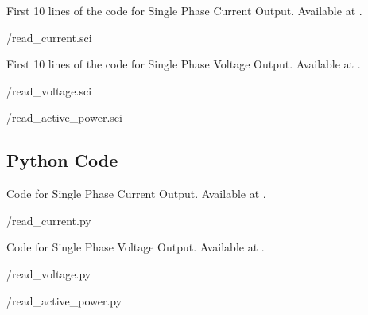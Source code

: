 \begin{scicode}
{First 10 lines of the code for Single Phase Current Output.
  Available at .}
\label{sci:current-modbus}

{\LocMODscicode/read_current.sci}
\end{scicode}

\begin{scicode}
{First 10 lines of the code for Single Phase Voltage Output.
  Available at .}
\label{sci:voltage-modbus}

{\LocMODscicode/read_voltage.sci}
\end{scicode}

\begin{scicode}
\label{sci:modbus-power}

{\LocMODscicode/read_active_power.sci}
\end{scicode}

\subsection{Python Code}
\label{sec:modbus-python-code}

\begin{pycode}
{Code for Single Phase Current Output.
  Available at .}
\label{py:current-modbus}

{\LocMODpycode/read_current.py}
\end{pycode}

\begin{pycode}
{Code for Single Phase Voltage Output.
  Available at .}
\label{py:voltage-modbus}

{\LocMODpycode/read_voltage.py}
\end{pycode}

\begin{pycode}
\label{py:modbus-power}

{\LocMODpycode/read_active_power.py}
\end{pycode}


